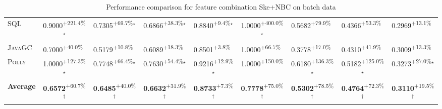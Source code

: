 \begin{table}[htbp]
\begin{tabular}{l|cccc|cccc}
\textsc{SQL} & \cellcolor{green!30}0.9000\textsuperscript{+221.4\%}$^\star$ & \cellcolor{green!30}0.7305\textsuperscript{+69.7\%}$^\star$ & \cellcolor{green!30}0.6866\textsuperscript{+38.3\%}$^\star$ & \cellcolor{green!30}0.8840\textsuperscript{+9.4\%}$^\star$ & \cellcolor{green!30}1.0000\textsuperscript{+400.0\%}$^\star$ & \cellcolor{green!30}0.5682\textsuperscript{+79.9\%}$^{\,\,\,}$ & \cellcolor{green!30}0.4366\textsuperscript{+53.3\%}$^{\,\,\,}$ & \cellcolor{green!30}0.2969\textsuperscript{+13.1\%}$^{\,\,\,}$ \\
\textsc{JavaGC} & \cellcolor{green!30}0.7000\textsuperscript{+40.0\%}$^{\,\,\,}$ & \cellcolor{green!30}0.5179\textsuperscript{+10.8\%}$^{\,\,\,}$ & \cellcolor{green!30}0.6089\textsuperscript{+18.3\%}$^{\,\,\,}$ & \cellcolor{green!30}0.8501\textsuperscript{+3.8\%}$^{\,\,\,}$ & \cellcolor{green!30}1.0000\textsuperscript{+66.7\%}$^{\,\,\,}$ & \cellcolor{green!30}0.3778\textsuperscript{+17.0\%}$^{\,\,\,}$ & \cellcolor{green!30}0.4310\textsuperscript{+41.9\%}$^{\,\,\,}$ & \cellcolor{green!30}0.3009\textsuperscript{+13.3\%}$^{\,\,\,}$ \\
\textsc{Polly} & \cellcolor{green!30}1.0000\textsuperscript{+127.3\%}$^\star$ & \cellcolor{green!30}0.7748\textsuperscript{+66.4\%}$^\star$ & \cellcolor{green!30}0.7630\textsuperscript{+54.4\%}$^\star$ & \cellcolor{green!30}0.9216\textsuperscript{+12.9\%}$^\star$ & \cellcolor{green!30}1.0000\textsuperscript{+150.0\%}$^{\,\,\,}$ & \cellcolor{green!30}0.6180\textsuperscript{+136.3\%}$^\star$ & \cellcolor{green!30}0.5182\textsuperscript{+125.0\%}$^\star$ & \cellcolor{green!30}0.3273\textsuperscript{+27.0\%}$^\star$ \\
\hline
\textbf{Average} & \cellcolor{green!30}\textbf{0.6572}\textsuperscript{+60.7\%}$^\dagger$ & \cellcolor{green!30}\textbf{0.6485}\textsuperscript{+40.0\%}$^\dagger$ & \cellcolor{green!30}\textbf{0.6632}\textsuperscript{+31.9\%}$^\dagger$ & \cellcolor{green!30}\textbf{0.8733}\textsuperscript{+7.3\%}$^\dagger$ & \cellcolor{green!30}\textbf{0.7778}\textsuperscript{+75.0\%}$^\dagger$ & \cellcolor{green!30}\textbf{0.5302}\textsuperscript{+78.5\%}$^\dagger$ & \cellcolor{green!30}\textbf{0.4764}\textsuperscript{+72.3\%}$^\dagger$ & \cellcolor{green!30}\textbf{0.3110}\textsuperscript{+19.5\%}$^\dagger$ \\
\hline
\end{tabular}
\caption{Performance comparison for feature combination Ske+NBC on batch data}
\label{tab:combo_Ske_NBC_performance_batch}
\end{table}